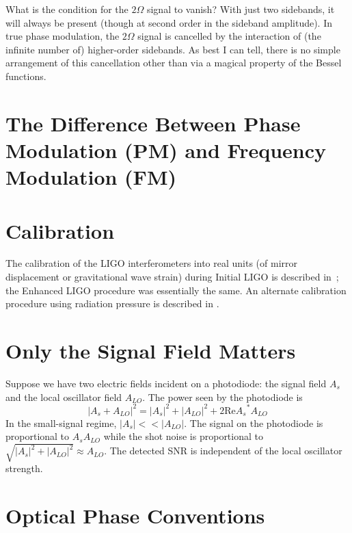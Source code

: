What is the condition for the $2\Omega$ signal to vanish? With just
two sidebands, it will always be present (though at second order in
the sideband amplitude). In true phase modulation, the $2\Omega$
signal is cancelled by the interaction of (the infinite number of)
higher-order sidebands. As best I can tell, there is no simple
arrangement of this cancellation other than via a magical property of
the Bessel functions.

\section{The Difference Between Phase Modulation (PM) and Frequency Modulation (FM)}

\section{Calibration}

The calibration of the LIGO interferometers into real units (of mirror
displacement or gravitational wave strain) during Initial LIGO is
described in~\cite{KisselCalibrationPaper}; the Enhanced LIGO procedure
was essentially the same.  An alternate calibration procedure using
radiation pressure is described in \cite{Goetz2010Gravitational}.

\section{Only the Signal Field Matters}

Suppose we have two electric fields incident on a photodiode: the
signal field $A_s$ and the local oscillator field $A_{LO}$.  The power
seen by the photodiode is
$$ \left| A_s + A_{LO} \right|^2 = 
   |A_s|^2 + |A_{LO}|^2 + 2 \mathrm{ Re } {A_s}^*A_{LO}$$
In the small-signal regime, $|A_s| << |A_{LO}|$.  The signal on the
photodiode is proportional to $A_s A_{LO}$ while the shot noise is
proportional to $\sqrt{|A_s|^2+|A_{LO}|^2}\approx A_{LO}$.  
  The detected SNR is independent of the local oscillator strength.

\section{Optical Phase Conventions}

